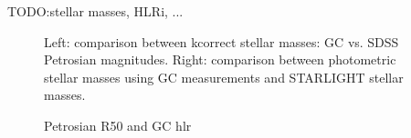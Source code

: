 \documentclass[apj, onecolumn]{emulateapj}
\begin{document}
TODO:stellar masses, HLRi, ...
\begin{figure}[h]
\centering
\caption{Left: comparison between kcorrect stellar masses: GC vs. SDSS Petrosian magnitudes. Right: comparison between photometric stellar masses using GC measurements and STARLIGHT stellar masses.}
\label{fig:app_mag_comparison}
\end{figure}

\begin{figure}[h]
\centering
\caption{Petrosian R50 and GC hlr}
\label{fig:petroR50}
\end{figure}






\clearpage
\end{document}
